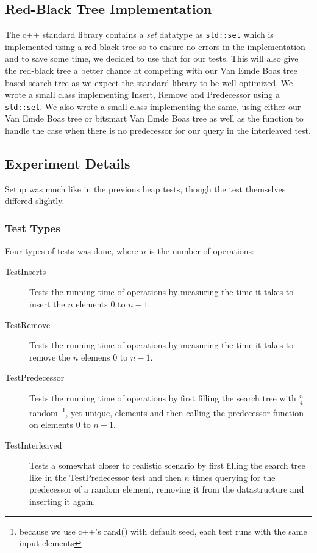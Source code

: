 \subsection{Red-Black Tree Implementation}
The c++ standard library contains a \textit{set} datatype as \texttt{std::set} which is implemented using a red-black tree so to ensure no errors in the implementation and to save some time, we decided to use that for our tests. This will also give the red-black tree a better chance at competing with our Van Emde Boas tree based search tree as we expect the standard library to be well optimized. We wrote a small class implementing Insert, Remove and Predecessor using a \texttt{std::set}. We also wrote a small class implementing the same, using either our Van Emde Boas tree or bitsmart Van Emde Boas tree as well as the  function to handle the case when there is no predecessor for our query in the interleaved test.

\subsection{Experiment Details}
Setup was much like in the previous heap tests, though the test themselves differed slightly.

\subsubsection{Test Types}
Four types of tests was done, where $n$ is the number of operations:
\begin{description}
\item[TestInserts] Tests the running time of  operations by measuring the time it takes to insert the $n$ elements $0$ to $n-1$.
\item[TestRemove] Tests the running time of  operations by measuring the time it takes to remove the $n$ elemens $0$ to $n-1$.
\item[TestPredecessor] Tests the running time of  operations by first filling the search tree with $\frac{n}{4}$ random~\footnote{because we use c++'s rand() with default seed, each test runs with the same input elements}, yet unique, elements and then calling the predecessor function on elements $0$ to $n-1$.
\item[TestInterleaved] Tests a somewhat closer to realistic scenario by first filling the search tree like in the TestPredecessor test and then $n$ times querying for the predecessor of a random element, removing it from the datastructure and inserting it again.
\end{description}

